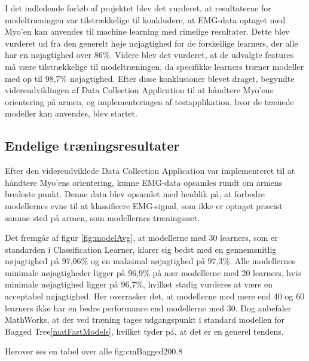  I det indledende forløb af projektet blev det vurderet, at resultaterne for modeltræningen var tilstrækkelige til konkludere, at EMG-data optaget med Myo'en kan anvendes til machine learning med rimelige resultater. Dette blev vurderet ud fra den generelt høje nøjagtighed for de forskellige learners, der alle har en nøjagtighed over 86\%. Videre blev det vurderet, at de udvalgte features må være tilstrækkelige til modeltræningen, da specifikke learners træner modeller med op til 98,7\% nøjagtighed. Efter disse konklusioner blevet draget, begyndte videreudviklingen af Data Collection Application til at håndtere Myo'ens orientering på armen, og implementeringen af testapplikation, hvor de trænede modeller kan anvendes, blev startet.

 \subsection{Endelige træningsresultater}
 Efter den videreudviklede Data Collection Application var implementeret til at håndtere Myo'ens orientering, kunne EMG-data opsamles rundt om armens bredeste punkt. Denne data blev opsamlet med henblik på, at forbedre modellernes evne til at klassificere EMG-signal, som ikke er optaget præcist samme sted på armen, som modellernes træningssæt.



Det fremgår af figur \ref{fig:modelAvg}, at modellerne med 30 learners, som er standarden i Classification Learner, klarer sig bedst med en gennemsnitlig nøjagtighed på 97,06\% og en maksimal nøjagtighed på 97,3\%. Alle modellernes minimale nøjagtigheder ligger på 96,9\% på nær modellerne med 20 learners, hvis minimale nøjagtighed ligger på 96,7\%, hvilket stadig vurderes at være en acceptabel nøjagtighed. Her overrasker det, at modellerne med mere end 40 og 60 learners ikke har en bedre performance end modellerne med 30. Dog anbefaler MathWorks, at der ved træning tages udgangspunkt i standard modellen for Bagged Tree\ref{matFastModels}, hvilket tyder på, at det er en generel tendens. 

 
{Herover ses en tabel over alle }{fig:cmBagged20}{0.8}
 